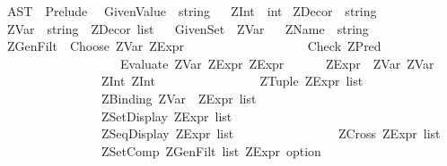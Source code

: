 %
\begin{isabellebody}%
%
%
\isamarkuptrue%
%
\isadelimtheory
%
\endisadelimtheory
%
\isatagtheory
{}\isamarkupfalse%
\ AST\ \ Prelude\ %
\endisatagtheory
{\isafoldtheory}%
%
\isadelimtheory
%
\endisadelimtheory
%
\isamarkuptrue%
\isamarkupfalse%
\ GivenValue\ {\isacharequal}\ string\isanewline
\ \isanewline
{}\isamarkupfalse%
\ ZInt\ {\isacharequal}\ int%
\isamarkuptrue%
\isamarkupfalse%
\ ZDecor\ {\isacharequal}\ string\isanewline
\ \isanewline
{}\isamarkupfalse%
\ ZVar\ {\isacharequal}\ {\isachardoublequoteopen}string\ {\isacharasterisk}\ {\isacharparenleft}ZDecor\ list{\isacharparenright}{\isachardoublequoteclose}\isanewline
\ \isanewline
{}\isamarkupfalse%
\ GivenSet\ {\isacharequal}\ ZVar\isanewline
\ \isanewline
{}\isamarkupfalse%
\ ZName\ {\isacharequal}\ string%
\isamarkuptrue%
\isamarkupfalse%
\ ZGenFilt\ {\isacharequal}\ Choose\ ZVar\ ZExpr\isanewline
\ \ \ \ \ \ \ \ \ \ \ \ \ \ \ \ \ \ {\isacharbar}\ Check\ ZPred\isanewline
\ \ \ \ \ \ \ \ \ \ \ \ \ \ \ \ \ \ {\isacharbar}\ Evaluate\ ZVar\ ZExpr\ ZExpr\isanewline
{}\ \ \ \ \ \ ZExpr\ {\isacharequal}\ ZVar\ ZVar\isanewline
\ \ \ \ \ \ \ \ \ \ \ \ \ \ \ {\isacharbar}\ ZInt\ ZInt\isanewline
\ \ \ \ \ \ \ \ \ \ \ \ \ \ \ {\isacharbar}\ ZTuple\ {\isachardoublequoteopen}ZExpr\ list{\isachardoublequoteclose}\isanewline
\ \ \ \ \ \ \ \ \ \ \ \ \ \ \ {\isacharbar}\ ZBinding\ {\isachardoublequoteopen}{\isacharparenleft}ZVar\ {\isacharasterisk}\ ZExpr{\isacharparenright}\ list{\isachardoublequoteclose}\isanewline
\ \ \ \ \ \ \ \ \ \ \ \ \ \ \ {\isacharbar}\ ZSetDisplay\ {\isachardoublequoteopen}ZExpr\ list{\isachardoublequoteclose}\isanewline
\ \ \ \ \ \ \ \ \ \ \ \ \ \ \ {\isacharbar}\ ZSeqDisplay\ {\isachardoublequoteopen}ZExpr\ list{\isachardoublequoteclose}\isanewline
\ \ \ \ \ \ \ \ \ \ \ \ \ \ \ {\isacharbar}\ ZCross\ {\isachardoublequoteopen}ZExpr\ list{\isachardoublequoteclose}\isanewline
\ \ \ \ \ \ \ \ \ \ \ \ \ \ \ {\isacharbar}\ ZSetComp\ {\isachardoublequoteopen}ZGenFilt\ list{\isachardoublequoteclose}\ {\isachardoublequoteopen}ZExpr\ option{\isachardoublequoteclose}\isanewline

\end{isabellebody}
